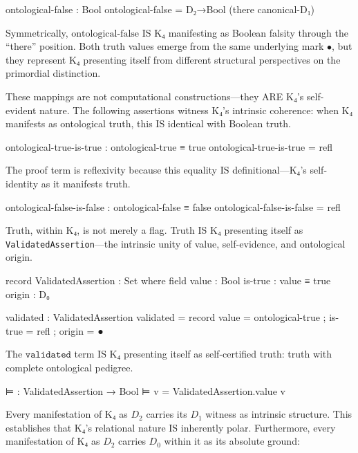 \documentclass[11pt,a4paper]{book}
\begin{document}
\begin{code}
ontological-false : Bool
ontological-false = D₂→Bool (there canonical-D₁)
\end{code}

Symmetrically, $\text{ontological-false}$ IS K₄ manifesting as Boolean falsity through the ``there'' position. Both truth values emerge from the same underlying mark $\bullet$, but they represent K₄ presenting itself from different structural perspectives on the primordial distinction.

These mappings are not computational constructions—they ARE K₄'s self-evident nature. The following assertions witness K₄'s intrinsic coherence: when K₄ manifests as ontological truth, this IS identical with Boolean truth.

\begin{code}
ontological-true-is-true : ontological-true ≡ true
ontological-true-is-true = refl
\end{code}

The proof term is reflexivity because this equality IS definitional—K₄'s self-identity as it manifests truth.

\begin{code}
ontological-false-is-false : ontological-false ≡ false
ontological-false-is-false = refl
\end{code}

Truth, within K₄, is not merely a flag. Truth IS K₄ presenting itself as \texttt{ValidatedAssertion}—the intrinsic unity of value, self-evidence, and ontological origin.

\begin{code}
record ValidatedAssertion : Set where
  field
    value : Bool
    is-true : value ≡ true
    origin : D₀
\end{code}

\begin{code}
validated : ValidatedAssertion
validated = record
  { value = ontological-true
  ; is-true = refl
  ; origin = ●
  }
\end{code}

The $\texttt{validated}$ term IS K₄ presenting itself as self-certified truth: truth with complete ontological pedigree.

\begin{code}
⊨ : ValidatedAssertion → Bool
⊨ v = ValidatedAssertion.value v

\end{code}

Every manifestation of K₄ as $D_2$ carries its $D_1$ witness as intrinsic structure. This establishes that K₄'s relational nature IS inherently polar. Furthermore, every manifestation of K₄ as $D_2$ carries $D_0$ within it as its absolute ground:
\end{document}
